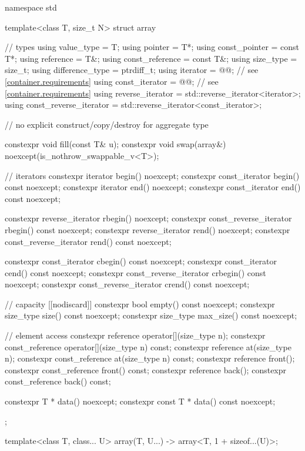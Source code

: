 %
%
%
%
%
\begin{codeblock}
namespace std {
  template<class T, size_t N>
  struct array {
    // types
    using value_type             = T;
    using pointer                = T*;
    using const_pointer          = const T*;
    using reference              = T&;
    using const_reference        = const T&;
    using size_type              = size_t;
    using difference_type        = ptrdiff_t;
    using iterator               = @@; // see \ref{container.requirements}
    using const_iterator         = @@; // see \ref{container.requirements}
    using reverse_iterator       = std::reverse_iterator<iterator>;
    using const_reverse_iterator = std::reverse_iterator<const_iterator>;

    // no explicit construct/copy/destroy for aggregate type

    constexpr void fill(const T& u);
    constexpr void swap(array&) noexcept(is_nothrow_swappable_v<T>);

    // iterators
    constexpr iterator               begin() noexcept;
    constexpr const_iterator         begin() const noexcept;
    constexpr iterator               end() noexcept;
    constexpr const_iterator         end() const noexcept;

    constexpr reverse_iterator       rbegin() noexcept;
    constexpr const_reverse_iterator rbegin() const noexcept;
    constexpr reverse_iterator       rend() noexcept;
    constexpr const_reverse_iterator rend() const noexcept;

    constexpr const_iterator         cbegin() const noexcept;
    constexpr const_iterator         cend() const noexcept;
    constexpr const_reverse_iterator crbegin() const noexcept;
    constexpr const_reverse_iterator crend() const noexcept;

    // capacity
    [[nodiscard]] constexpr bool empty() const noexcept;
    constexpr size_type size() const noexcept;
    constexpr size_type max_size() const noexcept;

    // element access
    constexpr reference       operator[](size_type n);
    constexpr const_reference operator[](size_type n) const;
    constexpr reference       at(size_type n);
    constexpr const_reference at(size_type n) const;
    constexpr reference       front();
    constexpr const_reference front() const;
    constexpr reference       back();
    constexpr const_reference back() const;

    constexpr T *       data() noexcept;
    constexpr const T * data() const noexcept;
  };

  template<class T, class... U>
    array(T, U...) -> array<T, 1 + sizeof...(U)>;
}
\end{codeblock}

